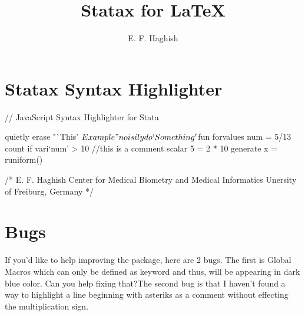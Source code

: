 \documentclass[12pt]{article}
\title{Statax for LaTeX}
\author{E. F. Haghish}
\begin{document}
	
	\maketitle
	
\section{Statax Syntax Highlighter}
	
	
	\begin{statax}
	
	// JavaScript Syntax Highlighter for Stata
	
	quietly erase "`This' $Example"
	noisily do `Something' $fun
	forvalues num = 5/13 {
	count if vari`num' > 10 //this is a comment
	scalar 5 = 2 * 10 
	generate x = runiform()
	}
	
	/*
	E. F. Haghish
	Center for Medical Biometry and Medical Informatics
	Unersity of Freiburg, Germany
	*/
	\end{statax}

\section{Bugs}
If you'd like to help improving the package, here are 2 bugs. The first is Global Macros which can only be defined as keyword and thus, will be appearing in dark blue color. Can you help fixing that?The second bug is that I haven't found a way to highlight a line beginning with asteriks as a comment without effecting the multiplication sign. 
	
\end{document}

